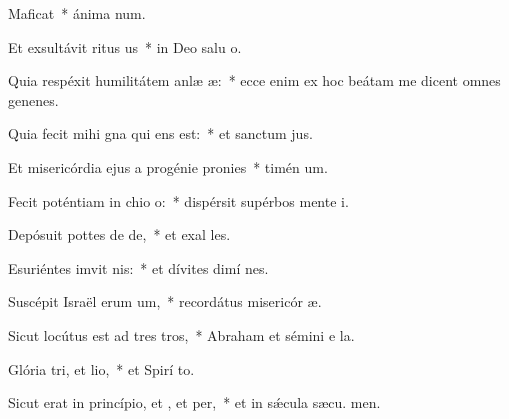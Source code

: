 \item Maficat~* ánima  num.
\item Et exsultávit ritus us~* in Deo salu o.
\item Quia respéxit humilitátem anlæ æ:~* ecce enim ex hoc beátam me dicent omnes genenes.
\item Quia fecit mihi gna qui ens est:~* et sanctum  jus.
\item Et misericórdia ejus a progénie  pronies~* timén um.
\item Fecit poténtiam in chio o:~* dispérsit supérbos mente  i.
\item Depósuit pottes de de,~* et exal les.
\item Esuriéntes imvit nis:~* et dívites dimí nes.
\item Suscépit Israël erum um,~* recordátus misericór æ.
\item Sicut locútus est ad tres tros,~* Abraham et sémini e  la.
\item Glória tri, et lio,~* et Spirí to.
\item Sicut erat in princípio, et , et per,~* et in sǽcula sæcu. men.
